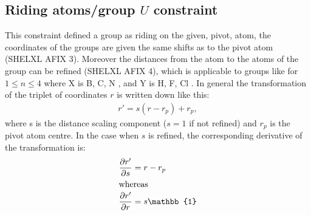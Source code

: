 \documentclass[11pt]{article}
\newcommand{\identity}{\mathbb{1}}
\newcommand{\partialder}[2]{\frac{\partial #1}{\partial #2}}
\begin{document}
\subsection{Riding atoms/group $U$ constraint}
This constraint defined a group as riding on the given, pivot, atom,  the coordinates of the groups are given the same shifts as to the pivot atom (SHELXL AFIX 3). Moreover the distances from the atom to the atoms of the group can be refined (SHELXL AFIX 4), which is applicable to groups like  for $1 \leq n \leq 4$ where X is B, C, N , and Y is H, F, Cl . In general the transformation of the triplet of coordinates $r$ is written down like this:
\begin{align}
r' = s(r-r_{p}) + r_{p}, \label{eqn:isometry}
\end{align}
where s is the distance scaling component ($s=1$ if not refined) and $r_{p}$ is the pivot atom centre. In the case when $s$ is refined, the corresponding derivative of the transformation is:
\begin{align}
\partialder{r'}{s} &= r-r_{p} \\
\intertext{whereas}
\partialder{r'}{r} &= s \identity
\end{align}
\end{document}
